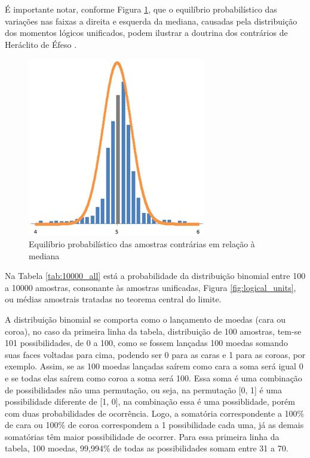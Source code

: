 É importante notar, conforme Figura \ref{fig:trend_chart_of_normal_distribution}, que o equilíbrio probabilístico das variações nas faixas a direita e esquerda da mediana, causadas pela distribuição dos momentos lógicos unificados, podem ilustrar a doutrina dos contrários de Heráclito de Éfeso \cite{brasilescola_heraclito}.
	\begin{figure}[H]
	\caption{Equilíbrio probabilístico das amostras contrárias em relação à mediana}
	\label{fig:trend_chart_of_normal_distribution}
	\centering
	\includegraphics[scale=1.1]{sections/images/trend_chart_of_normal_distribution.jpg}
	\end{figure}

Na Tabela \ref{tab:10000_all} está a probabilidade da distribuição binomial entre 100 a 10000 amostras, consonante às amostras unificadas, Figura \ref{fig:logical_units}, ou médias amostrais tratadas no teorema central do limite.

A distribuição binomial se comporta como o lançamento de moedas (cara ou coroa), no caso da primeira linha da tabela, distribuição de 100 amostras, tem-se 101 possibilidades, de 0 a 100, como se fossem lançadas 100 moedas somando suas faces voltadas para cima, podendo ser 0 para as caras e 1 para as coroas, por exemplo. Assim, se as 100 moedas lançadas saírem como cara a soma será igual 0 e se todas elas saírem como coroa a soma será 100. Essa soma é uma combinação de possibilidades não uma permutação, ou seja, na permutação [0, 1] é uma possibilidade diferente de [1, 0], na combinação essa é uma possiblidade, porém com duas probabilidades de ocorrência. Logo, a somatória correspondente a 100\% de cara ou 100\% de coroa correspondem a 1 possibilidade cada uma, já as demais somatórias têm maior possibilidade de ocorrer. Para essa primeira linha da tabela, 100 moedas, 99,994\% de todas as possibilidades somam entre 31 a 70. 

